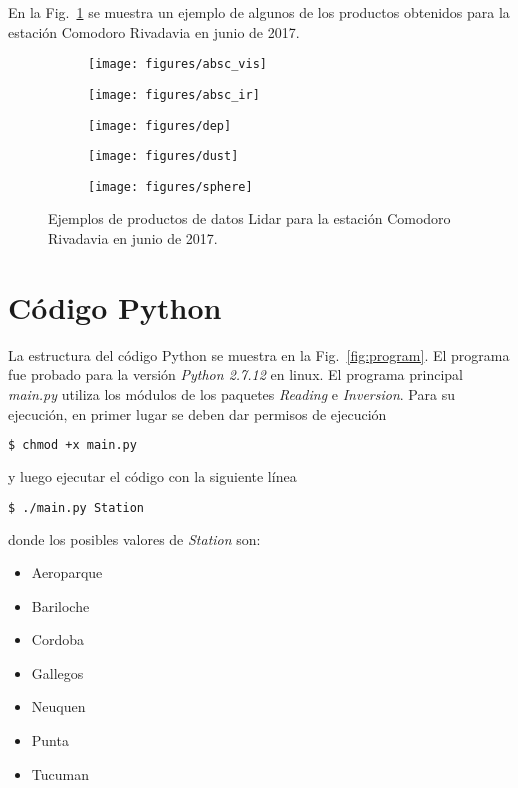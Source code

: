 \documentclass[12pt,a4paper,final]{report}
\begin{document}
	En la Fig.~\ref{fig:products} se muestra un ejemplo de algunos de los productos obtenidos para la estación Comodoro Rivadavia en junio de 2017.
	
	\begin{figure}
		\begin{subfigure}{\textwidth}
		  \centering
		  \texttt{[image: figures/absc\_vis]}
		\end{subfigure}

		\begin{subfigure}{\textwidth}
			\centering
			\texttt{[image: figures/absc\_ir]}
		\end{subfigure}
		
		\begin{subfigure}{\textwidth}
			\centering
			\texttt{[image: figures/dep]}
		\end{subfigure}

		\begin{subfigure}{\textwidth}
			\centering
			\texttt{[image: figures/dust]}
		\end{subfigure}
		
		\begin{subfigure}{\textwidth}
			\centering
			\texttt{[image: figures/sphere]}
		\end{subfigure}
		\caption{Ejemplos de productos de datos Lidar para la estación Comodoro Rivadavia en junio de 2017.}
		\label{fig:products}
	\end{figure}
	
	\chapter{Código Python}
	La estructura del código Python se muestra en la Fig.~\ref{fig:program}. El programa fue probado para la versión \emph{Python 2.7.12} en linux. El programa principal \emph{main.py} utiliza los módulos de los paquetes \emph{Reading} e \emph{Inversion}. Para su ejecución, en primer lugar se deben dar permisos de ejecución
	\begin{lstlisting}[language=bash]
	$ chmod +x main.py
	\end{lstlisting}	
	y luego ejecutar el código con la siguiente línea
	\begin{lstlisting}[language=bash]
	$ ./main.py Station
	\end{lstlisting}
	donde los posibles valores de \emph{Station} son:
	\begin{itemize}
		\item Aeroparque
		\item Bariloche
		\item Cordoba
		\item Gallegos
		\item Neuquen
		\item Punta
		\item Tucuman
	\end{itemize}
	
\end{document}
